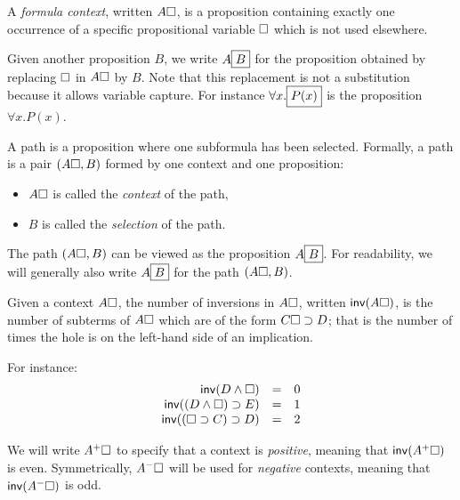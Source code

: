 \begin{definition}\label{def:formula-context}
  A \emph{formula context}, written $A\square$, is a proposition containing
  exactly one occurrence of a specific propositional variable $\square$ which is
  not used elsewhere.

  Given another proposition $B$, we write $A\fbox{$B$}$ for the
  proposition obtained by replacing $\square$ in $A\square$ by $B$. Note
  that this replacement is not a substitution because it allows variable
  capture. For instance $\forall x.\fbox{$P(x)$}$ is the proposition
  $\forall x.P(x)$.
\end{definition}

\begin{definition}[Path]\label{def:path}
A path is a proposition where one subformula has been
selected. Formally, a path is a pair $(A\square, B)$ formed by one
context and one proposition:
\begin{itemize}
\item $A\square$ is called the {\em context} of the path,
\item $B$ is called the {\em selection} of the path.
\end{itemize}

The path $(A\square, B)$ can be viewed as the proposition
$A\fbox{$B$}$.  For readability, we will generally also write
$A\fbox{$B$}$ for the path $(A\square, B)$.
\end{definition}

\begin{definition}[Inversions]
  Given a context $A\square$, the number of inversions in $A\square$,
  written $\mathsf{inv}(A\square)$, is the number of subterms of $A\square$
  which are of the form $C\square\supset D$; that is the number of
  times the hole is on the left-hand side of an implication.
  \end{definition}
\noindent  For instance:
  $$
\begin{array}{rcl}
    \mathsf{inv}(D\land \square)&=& 0\\
    \mathsf{inv}((D\land \square)\supset E)&=&1\\
    \mathsf{inv}((\square\supset C)\supset D) &=& 2
\end{array}
$$

\begin{definition}\label{def:polarity}
We will write $A^+\square$ to specify that a context is {\em positive},
meaning that $\mathsf{inv}(A^+\square)$ is even. Symmetrically, $A^-\square$ will be
used for {\em negative} contexts, meaning that $\mathsf{inv}(A^-\square)$ is odd.
\end{definition}

